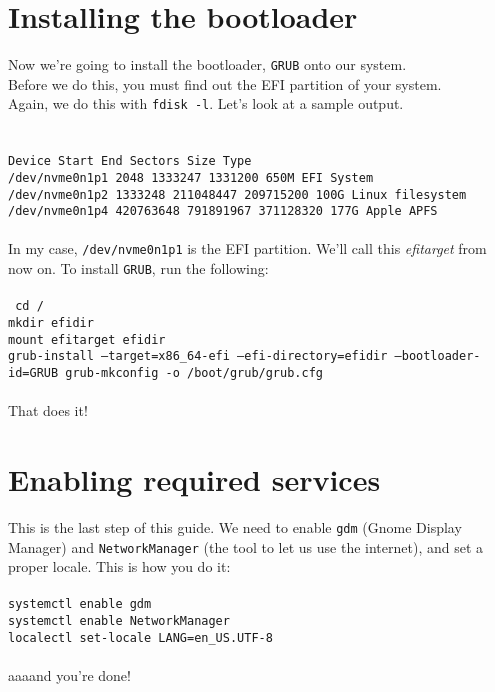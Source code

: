 \documentclass{article}
\begin{document}
\section{Installing the bootloader}
Now we're going to install the bootloader, \texttt{GRUB} onto our system.
\\Before we do this, you must find out the EFI partition of your system.
\\Again, we do this with \texttt{fdisk -l}. Let's look at a sample output.
\\\\
\texttt{
  \\
Device             Start        End   Sectors  Size Type\\
/dev/nvme0n1p1      2048    1333247   1331200  650M EFI System\\
/dev/nvme0n1p2   1333248  211048447 209715200  100G Linux filesystem\\
/dev/nvme0n1p4 420763648  791891967 371128320  177G Apple APFS\\
}
\\
In my case, \texttt{/dev/nvme0n1p1} is the EFI partition. We'll call this \textit{efitarget} from now on. To install \texttt{GRUB}, run the following:
\\\\
\texttt{
  cd /\\
  mkdir efidir\\
  mount efitarget efidir\\
  grub-install --target=x86\_64-efi --efi-directory=efidir --bootloader-id=GRUB
  grub-mkconfig -o /boot/grub/grub.cfg
}
\\\\
That does it!

\section{Enabling required services}
This is the last step of this guide. We need to enable \texttt{gdm} (Gnome Display Manager) and \texttt{NetworkManager} (the tool to let us use the internet), and set a proper locale. This is how you do it:
\\\\
\texttt{systemctl enable gdm}\\
\texttt{systemctl enable NetworkManager}\\
\texttt{localectl set-locale LANG=en\_US.UTF-8}
\\\\
aaaand you're done!
\end{document}
